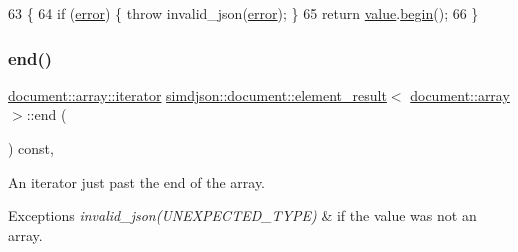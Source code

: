 \begin{DoxyCode}
63                                                                                                 \{
64   \textcolor{keywordflow}{if} (\hyperlink{classsimdjson_1_1document_1_1element__result_3_01document_1_1array_01_4_aa36a7760b8ba8a522969cf0e87eba4c9}{error}) \{ \textcolor{keywordflow}{throw} invalid\_json(\hyperlink{classsimdjson_1_1document_1_1element__result_3_01document_1_1array_01_4_aa36a7760b8ba8a522969cf0e87eba4c9}{error}); \}
65   \textcolor{keywordflow}{return} \hyperlink{classsimdjson_1_1document_1_1element__result_3_01document_1_1array_01_4_a2b9e99aedf1d1c2760aefee088144e61}{value}.\hyperlink{classsimdjson_1_1document_1_1array_ad5c3c380c55098b2266a311369819b8c}{begin}();
66 \}
\end{DoxyCode}
\mbox{\label{classsimdjson_1_1document_1_1element__result_3_01document_1_1array_01_4_a2a75b9c1ab622bbf3e9d5ee063a6c018}} 
\subsubsection{\texorpdfstring{end()}{end()}}
{\footnotesize\ttfamily \hyperlink{classsimdjson_1_1document_1_1array_1_1iterator}{document\+::array\+::iterator} \hyperlink{classsimdjson_1_1document_1_1element__result}{simdjson\+::document\+::element\+\_\+result}$<$ \hyperlink{classsimdjson_1_1document_1_1array}{document\+::array} $>$\+::end (\begin{DoxyParamCaption}{ }\end{DoxyParamCaption}) const\hspace{0.3cm}{\ttfamily [inline]}, {\ttfamily [noexcept]}}



An iterator just past the end of the array. 


\begin{DoxyExceptions}{Exceptions}
{\em invalid\+\_\+json(\+U\+N\+E\+X\+P\+E\+C\+T\+E\+D\+\_\+\+T\+Y\+P\+E)} & if the value was not an array. \\
\hline
\end{DoxyExceptions}


